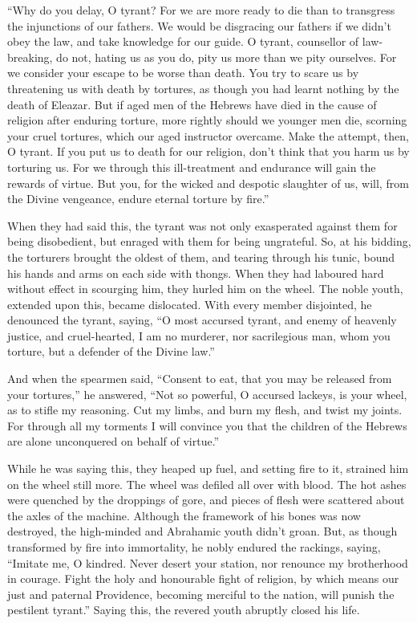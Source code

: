  ``Why do you delay, O tyrant? For we are more ready to die
than to transgress the injunctions of our fathers.  We would
be disgracing our fathers if we didn't obey the law, and take knowledge
for our guide.  O tyrant, counsellor of law-breaking, do
not, hating us as you do, pity us more than we pity ourselves.
 For we consider your escape to be worse than death.
 You try to scare us by threatening us with death by
tortures, as though you had learnt nothing by the death of Eleazar.
 But if aged men of the Hebrews have died in the cause of
religion after enduring torture, more rightly should we younger men die,
scorning your cruel tortures, which our aged instructor overcame.
 Make the attempt, then, O tyrant. If you put us to death
for our religion, don't think that you harm us by torturing us.
 For we through this ill-treatment and endurance will gain
the rewards of virtue.  But you, for the wicked and despotic
slaughter of us, will, from the Divine vengeance, endure eternal torture
by fire.''

 When they had said this, the tyrant was not only
exasperated against them for being disobedient, but enraged with them
for being ungrateful.  So, at his bidding, the torturers
brought the oldest of them, and tearing through his tunic, bound his
hands and arms on each side with thongs.  When they had
laboured hard without effect in scourging him, they hurled him on the
wheel.  The noble youth, extended upon this, became
dislocated.  With every member disjointed, he denounced the
tyrant, saying,  ``O most accursed tyrant, and enemy of
heavenly justice, and cruel-hearted, I am no murderer, nor sacrilegious
man, whom you torture, but a defender of the Divine law.''

 And when the spearmen said, ``Consent to eat, that you may
be released from your tortures,''  he answered, ``Not so
powerful, O accursed lackeys, is your wheel, as to stifle my reasoning.
Cut my limbs, and burn my flesh, and twist my joints.  For
through all my torments I will convince you that the children of the
Hebrews are alone unconquered on behalf of virtue.''

 While he was saying this, they heaped up fuel, and setting
fire to it, strained him on the wheel still more.  The
wheel was defiled all over with blood. The hot ashes were quenched by
the droppings of gore, and pieces of flesh were scattered about the
axles of the machine.  Although the framework of his bones
was now destroyed, the high-minded and Abrahamic youth didn't groan.
 But, as though transformed by fire into immortality, he
nobly endured the rackings, saying,  ``Imitate me, O
kindred. Never desert your station, nor renounce my brotherhood in
courage. Fight the holy and honourable fight of religion, 
by which means our just and paternal Providence, becoming merciful to
the nation, will punish the pestilent tyrant.''  Saying
this, the revered youth abruptly closed his life.

